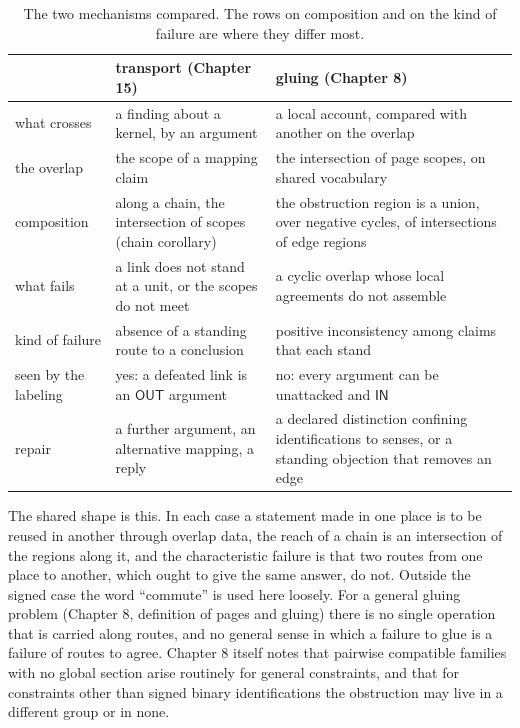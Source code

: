 \documentclass[11pt]{article}
\theoremstyle{plain}
\theoremstyle{definition}
\theoremstyle{remark}
\newcommand{\IN}{\textsf{IN}}
\newcommand{\OUT}{\textsf{OUT}}
\begin{document}
\begin{table}[ht]
\centering
\small
\begin{tabularx}{\textwidth}{@{}>{\raggedright\arraybackslash}p{}XX@{}}
\toprule
 & transport (Chapter 15) & gluing (Chapter 8)\\
\midrule
what crosses & a finding about a kernel, by an argument & a local account, compared with another on the overlap\\
the overlap & the scope of a mapping claim & the intersection of page scopes, on shared vocabulary\\
composition & along a chain, the intersection of scopes (chain corollary) & the obstruction region is a union, over negative cycles, of intersections of edge regions\\
what fails & a link does not stand at a unit, or the scopes do not meet & a cyclic overlap whose local agreements do not assemble\\
kind of failure & absence of a standing route to a conclusion & positive inconsistency among claims that each stand\\
seen by the labeling & yes: a defeated link is an $\OUT$ argument & no: every argument can be unattacked and $\IN$\\
repair & a further argument, an alternative mapping, a reply & a declared distinction confining identifications to senses, or a standing objection that removes an edge\\
\bottomrule
\end{tabularx}
\caption{The two mechanisms compared. The rows on composition and on the kind of failure are where they differ most.}\label{tab:analogy}
\end{table}

The shared shape is this. In each case a statement made in one place is to be reused in another through overlap data, the reach of a chain is an intersection of the regions along it, and the characteristic failure is that two routes from one place to another, which ought to give the same answer, do not. Outside the signed case the word ``commute'' is used here loosely. For a general gluing problem (Chapter 8, definition of pages and gluing) there is no single operation that is carried along routes, and no general sense in which a failure to glue is a failure of routes to agree. Chapter 8 itself notes that pairwise compatible families with no global section arise routinely for general constraints, and that for constraints other than signed binary identifications the obstruction may live in a different group or in none.
\end{document}
